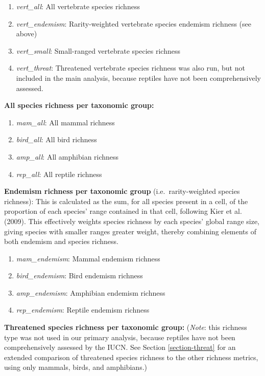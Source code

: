 \documentclass[
]{article}
\providecommand{\tightlist}{%
  \setlength{\itemsep}{0pt}\setlength{\parskip}{0pt}}
\begin{document}
\begin{enumerate}
\def\labelenumi{(\arabic{enumi})}
\setcounter{enumi}{4}
\tightlist
\item
  \emph{vert\_all}: All vertebrate species richness
\item
  \emph{vert\_endemism}: Rarity-weighted vertebrate species endemism richness (see above)
\item
  \emph{vert\_small}: Small-ranged vertebrate species richness
\item
  \emph{vert\_threat}: Threatened vertebrate species richness was also run, but not included in the main analysis, because reptiles have not been comprehensively assessed.
\end{enumerate}

\textbf{All species richness per taxonomic group:}

\begin{enumerate}
\def\labelenumi{(\arabic{enumi})}
\setcounter{enumi}{8}
\tightlist
\item
  \emph{mam\_all}: All mammal richness
\item
  \emph{bird\_all}: All bird richness
\item
  \emph{amp\_all}: All amphibian richness
\item
  \emph{rep\_all}: All reptile richness
\end{enumerate}

\textbf{Endemism richness per taxonomic group} (i.e.~rarity-weighted species richness):
This is calculated as the sum, for all species present in a cell, of the proportion of each species' range contained in that cell, following Kier et al. (2009). This effectively weights species richness by each species' global range size, giving species with smaller ranges greater weight, thereby combining elements of both endemism and species richness.

\begin{enumerate}
\def\labelenumi{(\arabic{enumi})}
\setcounter{enumi}{12}
\tightlist
\item
  \emph{mam\_endemism}: Mammal endemism richness
\item
  \emph{bird\_endemism}: Bird endemism richness
\item
  \emph{amp\_endemism}: Amphibian endemism richness
\item
  \emph{rep\_endemism}: Reptile endemism richness
\end{enumerate}

\textbf{Threatened species richness per taxonomic group:}
(\emph{Note}: this richness type was not used in our primary analysis, because reptiles have not been comprehensively assessed by the IUCN. See Section \ref{section-threat} for an extended comparison of threatened species richness to the other richness metrics, using only mammals, birds, and amphibians.)
\end{document}
